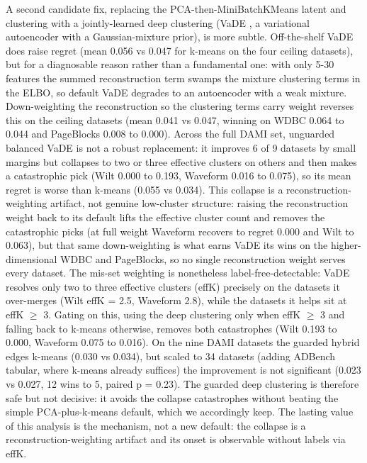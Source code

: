 \documentclass[3p,twocolumn]{elsarticle}
\begin{document}
A second candidate fix, replacing the PCA-then-MiniBatchKMeans latent and clustering with a jointly-learned deep clustering (VaDE \cite{ref21}, a variational autoencoder with a Gaussian-mixture prior), is more subtle. Off-the-shelf VaDE does raise regret (mean 0.056 vs 0.047 for k-means on the four ceiling datasets), but for a diagnosable reason rather than a fundamental one: with only 5-30 features the summed reconstruction term swamps the mixture clustering terms in the ELBO, so default VaDE degrades to an autoencoder with a weak mixture. Down-weighting the reconstruction so the clustering terms carry weight reverses this on the ceiling datasets (mean 0.041 vs 0.047, winning on WDBC 0.064 to 0.044 and PageBlocks 0.008 to 0.000). Across the full DAMI set, unguarded balanced VaDE is not a robust replacement: it improves 6 of 9 datasets by small margins but collapses to two or three effective clusters on others and then makes a catastrophic pick (Wilt 0.000 to 0.193, Waveform 0.016 to 0.075), so its mean regret is worse than k-means (0.055 vs 0.034). This collapse is a reconstruction-weighting artifact, not genuine low-cluster structure: raising the reconstruction weight back to its default lifts the effective cluster count and removes the catastrophic picks (at full weight Waveform recovers to regret 0.000 and Wilt to 0.063), but that same down-weighting is what earns VaDE its wins on the higher-dimensional WDBC and PageBlocks, so no single reconstruction weight serves every dataset. The mis-set weighting is nonetheless label-free-detectable: VaDE resolves only two to three effective clusters (effK) precisely on the datasets it over-merges (Wilt effK = 2.5, Waveform 2.8), while the datasets it helps sit at effK $\geq$ 3. Gating on this, using the deep clustering only when effK $\geq$ 3 and falling back to k-means otherwise, removes both catastrophes (Wilt 0.193 to 0.000, Waveform 0.075 to 0.016). On the nine DAMI datasets the guarded hybrid edges k-means (0.030 vs 0.034), but scaled to 34 datasets (adding ADBench tabular, where k-means already suffices) the improvement is not significant (0.023 vs 0.027, 12 wins to 5, paired p = 0.23). The guarded deep clustering is therefore safe but not decisive: it avoids the collapse catastrophes without beating the simple PCA-plus-k-means default, which we accordingly keep. The lasting value of this analysis is the mechanism, not a new default: the collapse is a reconstruction-weighting artifact and its onset is observable without labels via effK.
\end{document}
